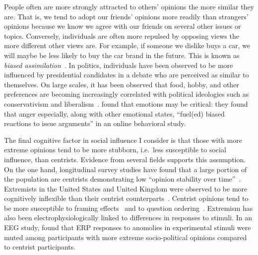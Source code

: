 People often are more strongly attracted to others' opinions the more similar
they are. That is, we tend to adopt our friends' opinions more readily than
strangers' opinions because we know we agree with our friends on several other
issues or topics. Conversely, individuals are often
more repulsed by opposing views the more different other views are. For 
example, if someone we dislike buys a car, we will maybe be less likely to buy the
car brand in the future. This is
known as \emph{biased assimilation}~\cite{Lord1979}.
In politics, individuals have been observed to be more influenced by presidential
candidates in a debate who are perceived as similar to themselves.
On large scales, it has been observed that food, hobby, and other
preferences are becoming increasingly correlated with political ideologies such
as conservativism and liberalism~\cite{DellaPosta2015}.
 found that emotions may be critical: they found that
anger especially, along with other emotional states, ``fuel(ed) biased reactions
to issue arguments'' in an online behavioral study. 

The final cognitive factor in social influence I consider is that those with
more extreme opinions tend to be more stubborn, i.e.\ less susceptible to
social influence, than centrists. Evidence from several fields supports
this assumption. On the one hand, longitudinal survey studies
have found that a large portion of the population are centrists demonstrating
low ``opinion stability over time''~\cite{Converse1964,Zaller1992,Kinder2017}. 
Extremists in the United States and United Kingdom were observed to be 
more cognitively inflexible than their centrist counterparts~\cite{Zmigrod2019a}.
Centrist opinions tend to be more susceptible to framing effects~\cite{Chong2007}
and to question ordering~\cite{Zaller1992}. Extremism has also been electrophysiologically linked
to differences in responses to stimuli. In an EEG study,  found that ERP
responses to anomolies in experimental stimuli were muted among participants
with more extreme socio-political opinions compared to centrist participants.

